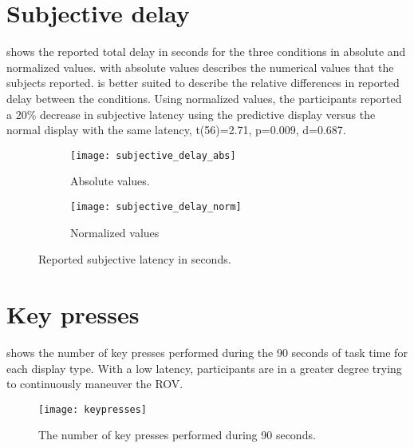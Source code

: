 \section{Subjective delay}

 shows the reported total delay in seconds for the three conditions in absolute and normalized values.  with absolute values describes the numerical values that the subjects reported.  is better suited to describe the relative differences in reported delay between the conditions. Using normalized values, the participants reported a 20\% decrease in subjective latency using the predictive display versus the normal display with the same latency, t(56)=2.71, p=0.009, d=0.687.

\begin{figure}[ht!]
\begin{subfigure}{0.5\textwidth}
    \centering
    \texttt{[image: subjective\_delay\_abs]}
    \caption{Absolute values.}
    \label{delay_abs}
\end{subfigure}
\hfill
\begin{subfigure}{0.5\textwidth}
    \centering
    \texttt{[image: subjective\_delay\_norm]}
    \caption{Normalized values}
    \label{delay_norm}
\end{subfigure}
\caption{Reported subjective latency in seconds.}
\label{subjective_delay}
\end{figure}

\section{Key presses}

 shows the number of key presses performed during the 90 seconds of task time for each display type. With a low latency, participants are in a greater degree trying to continuously maneuver the ROV.

\begin{figure}[h!]
    \centering
    \texttt{[image: keypresses]}
    \caption{The number of key presses performed during 90 seconds.}
    \label{keypresses}
\end{figure}

